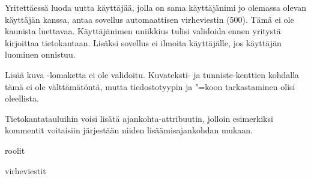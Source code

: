 \documentclass[finnish,colorlinks,headings=normal,parskip=half,footsepline]{scrartcl}
\begin{document}
Yritettäessä luoda uutta käyttäjää, jolla on sama käyttäjänimi jo olemassa olevan käyttäjän kanssa, antaa sovellus automaattisen virheviestin (500). Tämä ei ole kaunista luettavaa. Käyttäjänimen uniikkius tulisi validoida ennen yritystä kirjoittaa tietokantaan. Lisäksi sovellus ei ilmoita käyttäjälle, jos käyttäjän luominen onnistuu.

Lisää kuva -lomaketta ei ole validoitu. Kuvateksti- ja tunniste-kenttien kohdalla tämä ei ole välttämätöntä, mutta tiedostotyypin ja "=koon tarkastaminen olisi oleellista.

Tietokantatauluihin voisi lisätä ajankohta-attribuutin, jolloin esimerkiksi kommentit voitaisiin järjestään niiden lisäämisajankohdan mukaan.

roolit

virheviestit
\end{document}

